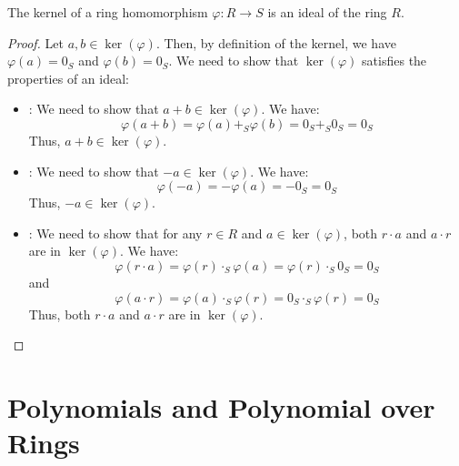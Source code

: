 \documentclass[openany]{book}
\begin{document}
\begin{mytheorem}
The kernel of a ring homomorphism $\varphi: R \to S$ is an ideal of the ring $R$.
\end{mytheorem}
\begin{proof}
Let $a, b \in \ker(\varphi)$. Then, by definition of the kernel, we have $\varphi(a) = 0_S$ and $\varphi(b) = 0_S$. We need to show that $\ker(\varphi)$ satisfies the properties of an ideal:
\begin{itemize}
    \item {}: We need to show that $a + b \in \ker(\varphi)$. We have:
    \[\varphi(a + b) = \varphi(a) +_S \varphi(b) = 0_S +_S 0_S = 0_S\]
    Thus, $a + b \in \ker(\varphi)$.
    \item {}: We need to show that $-a \in \ker(\varphi)$. We have:
    \[\varphi(-a) = -\varphi(a) = -0_S = 0_S\]
    Thus, $-a \in \ker(\varphi)$.
    \item {}: We need to show that for any $r \in R$ and $a \in \ker(\varphi)$, both $r \cdot a$ and $a \cdot r$ are in $\ker(\varphi)$. We have:
    \[\varphi(r \cdot a) = \varphi(r) \cdot_S \varphi(a) = \varphi(r) \cdot_S 0_S = 0_S\]
    and
    \[\varphi(a \cdot r) = \varphi(a) \cdot_S \varphi(r) = 0_S \cdot_S \varphi(r) = 0_S\]
    Thus, both $r \cdot a$ and $a \cdot r$ are in $\ker(\varphi)$.
\end{itemize}
\end{proof}



\chapter{Polynomials and Polynomial over Rings}
\end{document}

